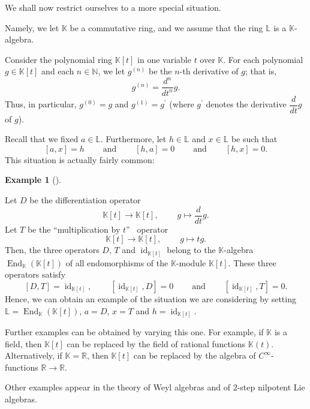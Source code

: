 \documentclass[numbers=enddot,12pt,final,onecolumn,notitlepage]{scrartcl}%
\theoremstyle{definition}
\newtheorem{exam}[theo]{Example}
\newenvironment{example}[1][]
{\begin{exam}[#1]\begin{leftbar}}
{\end{leftbar}\end{exam}}
\begin{document}
We shall now restrict ourselves to a more special situation.

Namely, we let $\mathbb{K}$ be a commutative ring, and we assume that the ring
$\mathbb{L}$ is a $\mathbb{K}$-algebra.

Consider the polynomial ring $\mathbb{K}\left[  t\right]  $ in one variable
$t$ over $\mathbb{K}$. For each polynomial $g\in\mathbb{K}\left[  t\right]  $
and each $n\in\mathbb{N}$, we let $g^{\left(  n\right)  }$ be the $n$-th
derivative of $g$; that is,
\begin{equation}
g^{\left(  n\right)  }=\dfrac{d^{n}}{dt^{n}}g. \label{eq.gn=}%
\end{equation}
Thus, in particular, $g^{\left(  0\right)  }=g$ and $g^{\left(  1\right)
}=g^{\prime}$ (where $g^{\prime}$ denotes the derivative $\dfrac{d}{dt}g$ of
$g$).

Recall that we fixed $a\in\mathbb{L}$. Furthermore, let $h\in\mathbb{L}$ and
$x\in\mathbb{L}$ be such that
\[
\left[  a,x\right]  =h\ \ \ \ \ \ \ \ \ \ \text{and}%
\ \ \ \ \ \ \ \ \ \ \left[  h,a\right]  =0\ \ \ \ \ \ \ \ \ \ \text{and}%
\ \ \ \ \ \ \ \ \ \ \left[  h,x\right]  =0.
\]
This situation is actually fairly common:

\begin{example}
\label{exa.weyl.weyl}Let $D$ be the differentiation operator
\[
\mathbb{K}\left[  t\right]  \rightarrow\mathbb{K}\left[  t\right]
,\ \ \ \ \ \ \ \ \ \ g\mapsto\dfrac{d}{dt}g.
\]
Let $T$ be the \textquotedblleft multiplication by $t$\textquotedblright%
\ operator%
\[
\mathbb{K}\left[  t\right]  \rightarrow\mathbb{K}\left[  t\right]
,\ \ \ \ \ \ \ \ \ \ g\mapsto tg.
\]
Then, the three operators $D$, $T$ and $\operatorname*{id}%
\nolimits_{\mathbb{K}\left[  t\right]  }$ belong to the $\mathbb{K}$-algebra
$\operatorname*{End}\nolimits_{\mathbb{K}}\left(  \mathbb{K}\left[  t\right]
\right)  $ of all endomorphisms of the $\mathbb{K}$-module $\mathbb{K}\left[
t\right]  $. These three operators satisfy%
\[
\left[  D,T\right]  =\operatorname*{id}\nolimits_{\mathbb{K}\left[  t\right]
},\ \ \ \ \ \ \ \ \ \ \left[  \operatorname*{id}\nolimits_{\mathbb{K}\left[
t\right]  },D\right]  =0\ \ \ \ \ \ \ \ \ \ \text{and}%
\ \ \ \ \ \ \ \ \ \ \left[  \operatorname*{id}\nolimits_{\mathbb{K}\left[
t\right]  },T\right]  =0.
\]
Hence, we can obtain an example of the situation we are considering by setting
$\mathbb{L}=\operatorname*{End}\nolimits_{\mathbb{K}}\left(  \mathbb{K}\left[
t\right]  \right)  $, $a=D$, $x=T$ and $h=\operatorname*{id}%
\nolimits_{\mathbb{K}\left[  t\right]  }$.

Further examples can be obtained by varying this one. For example, if
$\mathbb{K}$ is a field, then $\mathbb{K}\left[  t\right]  $ can be replaced
by the field of rational functions $\mathbb{K}\left(  t\right)  $.
Alternatively, if $\mathbb{K}=\mathbb{R}$, then $\mathbb{K}\left[  t\right]  $
can be replaced by the algebra of $C^{\infty}$-functions $\mathbb{R}%
\rightarrow\mathbb{R}$.

Other examples appear in the theory of Weyl algebras and of $2$-step nilpotent
Lie algebras.
\end{example}
\end{document}
